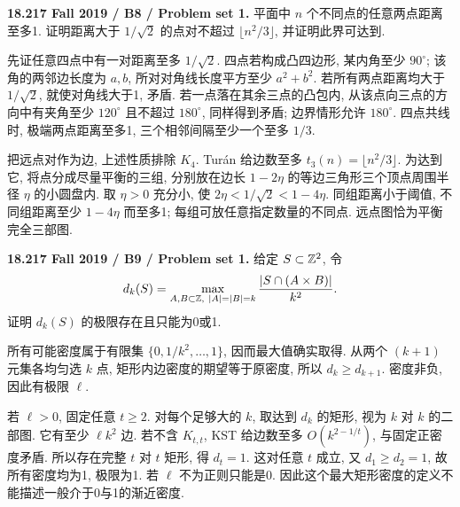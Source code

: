 \begin{exercise}\label{mit:18217-b8}
\textbf{18.217 Fall 2019 / B8 / Problem set 1.}
平面中 $n$ 个不同点的任意两点距离至多1. 证明距离大于 $1/\sqrt2$ 的点对不超过 $\lfloor n^2/3\rfloor$, 并证明此界可达到.
\end{exercise}
\begin{solution}
先证任意四点中有一对距离至多 $1/\sqrt2$. 四点若构成凸四边形, 某内角至少 $90^\circ$; 该角的两邻边长度为 $a,b$, 所对对角线长度平方至少 $a^2+b^2$. 若所有两点距离均大于 $1/\sqrt2$, 就使对角线大于1, 矛盾. 若一点落在其余三点的凸包内, 从该点向三点的方向中有夹角至少 $120^\circ$ 且不超过 $180^\circ$, 同样得到矛盾; 边界情形允许 $180^\circ$. 四点共线时, 极端两点距离至多1, 三个相邻间隔至少一个至多 $1/3$.

把远点对作为边, 上述性质排除 $K_4$. Turán 给边数至多 $t_3(n)=\lfloor n^2/3\rfloor$. 为达到它, 将点分成尽量平衡的三组, 分别放在边长 $1-2\eta$ 的等边三角形三个顶点周围半径 $\eta$ 的小圆盘内. 取 $\eta>0$ 充分小, 使 $2\eta<1/\sqrt2<1-4\eta$. 同组距离小于阈值, 不同组距离至少 $1-4\eta$ 而至多1; 每组可放任意指定数量的不同点. 远点图恰为平衡完全三部图.
\end{solution}

\begin{exercise}\label{mit:18217-b9}
\textbf{18.217 Fall 2019 / B9 / Problem set 1.}
给定 $S\subset\mathbb Z^2$, 令
\[
d_k(S)=\max_{A,B\subset\mathbb Z,\ |A|=|B|=k}
\frac{|S\cap(A\times B)|}{k^2}.
\]
证明 $d_k(S)$ 的极限存在且只能为0或1.
\end{exercise}
\begin{solution}
所有可能密度属于有限集 $\{0,1/k^2,\ldots,1\}$, 因而最大值确实取得. 从两个 $(k+1)$ 元集各均匀选 $k$ 点, 矩形内边密度的期望等于原密度, 所以 $d_k\ge d_{k+1}$. 密度非负, 因此有极限 $\ell$.

若 $\ell>0$, 固定任意 $t\ge2$. 对每个足够大的 $k$, 取达到 $d_k$ 的矩形, 视为 $k$ 对 $k$ 的二部图. 它有至少 $\ell k^2$ 边. 若不含 $K_{t,t}$, KST 给边数至多 $O(k^{2-1/t})$, 与固定正密度矛盾. 所以存在完整 $t$ 对 $t$ 矩形, 得 $d_t=1$. 这对任意 $t$ 成立, 又 $d_1\ge d_2=1$, 故所有密度均为1, 极限为1. 若 $\ell$ 不为正则只能是0. 因此这个最大矩形密度的定义不能描述一般介于0与1的渐近密度.
\end{solution}

